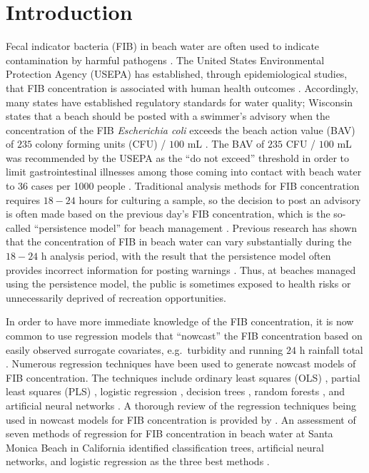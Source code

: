 \documentclass[authoryear,review, 12pt]{elsarticle}
\begin{document}
\section{Introduction}\label{introduction}

Fecal indicator bacteria (FIB) in beach water are often used to indicate
contamination by harmful pathogens \citep{Cabelli:1979lb,Wade:2006qc,Wade:2008yi,Fleisher:2010xo}. The United States Environmental
Protection Agency (USEPA) has established, through epidemiological
studies, that FIB concentration is associated with human health outcomes
\citep{Cabelli:1983od,Dufour:1984yn,USEPA:ecs}. Accordingly, many
states have established regulatory standards for water quality;
Wisconsin states that a beach should be posted with a swimmer's advisory
when the concentration of the FIB \emph{Escherichia coli} exceeds the
beach action value (BAV) of \(235\) colony forming units (CFU) / \(100\)
mL \citep{USEPA-2012,WDNR-2012}. The BAV of \(235\) CFU / \(100\) mL
was recommended by the USEPA as the ``do not exceed'' threshold in order
to limit gastrointestinal illnesses among those coming into contact with
beach water to 36 cases per 1000 people \citep{USEPA-2012}. Traditional
analysis methods for FIB concentration requires \(18-24\) hours for
culturing a sample, so the decision to post an advisory is often made
based on the previous day's FIB concentration, which is the so-called
``persistence model'' for beach management \citep{USEPA:2007lj}. Previous
research has shown that the concentration of FIB in beach water can vary
substantially during the \(18-24\) h analysis period, with the result
that the persistence model often provides incorrect information for
posting warnings \citep{Whitman:2004wv,Whitman:2008nb}. Thus, at
beaches managed using the persistence model, the public is sometimes
exposed to health risks or unnecessarily deprived of recreation
opportunities.

In order to have more immediate knowledge of the FIB concentration, it
is now common to use regression models that ``nowcast'' the FIB
concentration based on easily observed surrogate covariates,
e.g.~turbidity and running $24$ h rainfall total \citep{Brandt:2006gj,Olyphant:2004yq}. Numerous regression techniques have been used to
generate nowcast models of FIB concentration. The techniques include
ordinary least squares (OLS) \citep{Nevers:2005ln,Francy:2007yv},
partial least squares (PLS) \citep{Hou:2006nf,Brooks-Fienen-Corsi-2013}, logistic regression \citep{Waschbusch:2004bd,Jin:2006tr}, decision trees \citep{Stidson-2012}, random forests
\citep{Parkhurst:2005zf,Jones-Liu-Dorovitch-2012}, and artificial
neural networks \citep{Kashefipour-Lin-Falconer-2005,He:2008jx}. A
thorough review of the regression techniques being used in nowcast
models for FIB concentration is provided by
\citep{deBrauwere-Koffi-Servais-2014}. An assessment of seven methods of
regression for FIB concentration in beach water at Santa Monica Beach in
California identified classification trees, artificial neural networks,
and logistic regression as the three best methods
\citep{Thoe-Gold-Griesbach-Grimmer-Taggart-Boehm-2014}.
\end{document}
